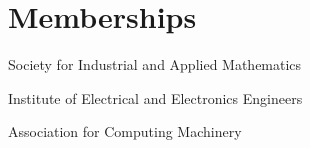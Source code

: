 \documentclass[11pt,letterpaper]{report}
\newcommand{\listitemspace}{0.25em}
\renewenvironment{itemize}
{\begin{list}{}{\setlength{\leftmargin}{0em}
                \setlength{\parskip}{0em}
                \setlength{\itemsep}{\listitemspace}
                \setlength{\parsep}{\listitemspace}}}
{\end{list}}
\begin{document}










    \section*{Memberships}

    \begin{itemize}
        \item Society for Industrial and Applied Mathematics 
        \item Institute of Electrical and Electronics Engineers 
        \item Association for Computing Machinery

    \end{itemize}
\end{document}
